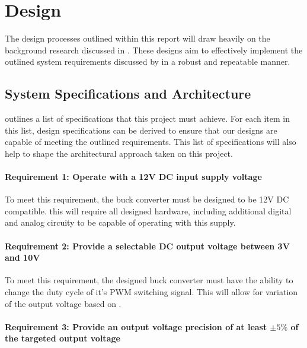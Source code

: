 \chapter{Design}\label{C:design}

The design processes outlined within this report will draw heavily on the background research discussed in . These designs aim to effectively implement the outlined system requirements discussed by  in a robust and repeatable manner.


%
%

\section{System Specifications and Architecture}\label{S:specs_design}

 outlines a list of specifications that this project must achieve. For each item in this list, design specifications can be derived to ensure that our designs are capable of meeting the outlined requirements. This list of specifications will also help to shape the architectural approach taken on this project.


\subsubsection*{Requirement 1: Operate with a 12V DC input supply voltage}

To meet this requirement, the buck converter must be designed to be 12V DC compatible. this will require all designed hardware, including additional digital and analog circuity to be capable of operating with this supply.

\subsubsection*{Requirement 2: Provide a selectable DC output voltage between 3V and 10V}

To meet this requirement, the designed buck converter must have the ability to change the duty cycle of it's PWM switching signal. This will allow for variation of the output voltage based on .

\subsubsection*{Requirement 3: Provide an output voltage precision of at least $\pm5\%$ of the targeted output voltage}

